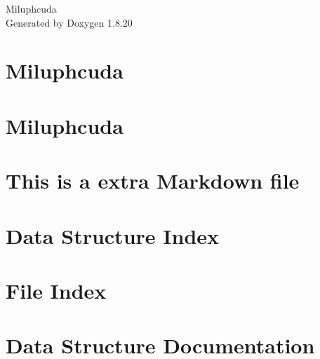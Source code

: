 \let\mypdfximage\pdfximage\def\pdfximage{\immediate\mypdfximage}\documentclass[twoside]{book}
\newcommand{\+}{\discretionary{\mbox{\scriptsize$\hookleftarrow$}}{}{}}
\newcommand{\clearemptydoublepage}{%
  \newpage{\pagestyle{empty}\cleardoublepage}%
}
\begin{document}
\hypersetup{pageanchor=false,
             bookmarksnumbered=true,
             pdfencoding=unicode
            }
\begin{titlepage}
\vspace*{7cm}
\begin{center}%
{\Large Miluphcuda }\\
\vspace*{1cm}
{\large Generated by Doxygen 1.8.20}\\
\end{center}
\end{titlepage}
\clearemptydoublepage
{}
\tableofcontents
\clearemptydoublepage
{}
\hypersetup{pageanchor=true}

\chapter{Miluphcuda}
\label{index}\hypertarget{index}{}
\chapter{Miluphcuda}
\label{md__r_e_a_d_m_e}

\chapter{This is a extra Markdown file}
\label{md_doc__extra_markdown}

\chapter{Data Structure Index}

\chapter{File Index}

\chapter{Data Structure Documentation}




\end{document}
